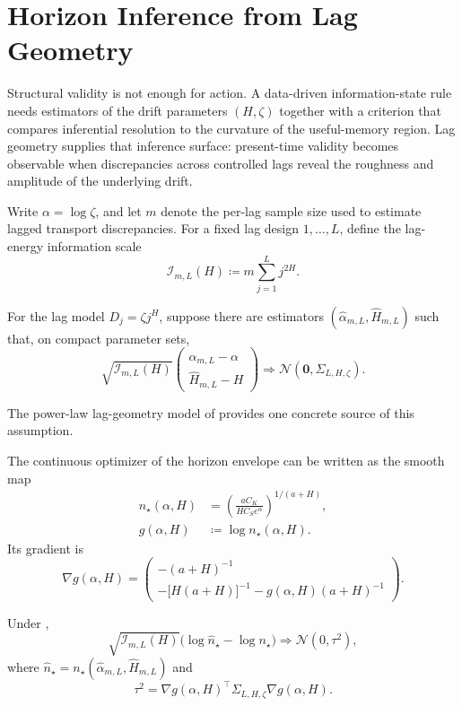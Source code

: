 \section{Horizon Inference from Lag Geometry}
\label{sec:validity_observability}

Structural validity is not enough for action. A data-driven information-state
rule needs estimators of the drift parameters $(H,\zeta)$ together with a
criterion that compares inferential resolution to the curvature of the
useful-memory region. Lag geometry supplies that inference surface: present-time
validity becomes observable when discrepancies across controlled lags reveal the
roughness and amplitude of the underlying drift.

Write $\alpha = \log \zeta$, and let $m$ denote the per-lag sample size used to
estimate lagged transport discrepancies. For a fixed lag design
$1,\dots,L$, define the lag-energy information scale
\[
  \mathcal I_{m,L}(H) \coloneqq m\sum_{j=1}^L j^{2H}.
\]

\begin{assumption}
\label{ass:lag_geometry_input}
For the lag model $D_j = \zeta j^H$, suppose there are estimators
$(\widehat \alpha_{m,L},\widehat H_{m,L})$ such that, on compact parameter sets,
\[
  \sqrt{\mathcal I_{m,L}(H)}
  \begin{pmatrix}
    \widehat \alpha_{m,L} - \alpha \\
    \widehat H_{m,L} - H
  \end{pmatrix}
  \Rightarrow \mathcal N(\mathbf 0, \Sigma_{L,H,\zeta}).
\]
\end{assumption}

The power-law lag-geometry model of \citet{Parreira2026Jul} provides one
concrete source of this assumption.

The continuous optimizer of the horizon envelope can be written as the smooth
map
\[
  \begin{aligned}
    n_\star(\alpha,H)
    &= \left(\frac{aC_K}{H C_S e^{\alpha}}\right)^{1/(a+H)}, \\
    g(\alpha,H) &\coloneqq \log n_\star(\alpha,H).
  \end{aligned}
\]
Its gradient is
\[
  \nabla g(\alpha,H)
  =
  \begin{pmatrix}
    -(a+H)^{-1} \\
    -\bigl[H(a+H)\bigr]^{-1} - g(\alpha,H)(a+H)^{-1}
  \end{pmatrix}.
\]

\begin{theorem}
\label{thm:plugin_horizon_clt}
Under ,
\[
  \sqrt{\mathcal I_{m,L}(H)}
  \bigl(\log \widehat n_\star - \log n_\star\bigr)
  \Rightarrow \mathcal N(0,\tau^2),
\]
where $\widehat n_\star = n_\star(\widehat \alpha_{m,L},\widehat H_{m,L})$ and
\[
  \tau^2
  = \nabla g(\alpha,H)^\top \Sigma_{L,H,\zeta} \nabla g(\alpha,H).
\]
\end{theorem}


